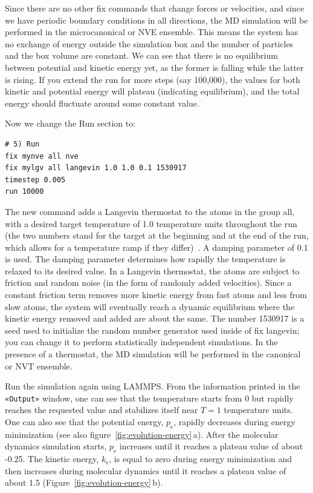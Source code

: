 \documentclass[9pt,tutorial]{livecoms}
\newcommand{\lmpcmd}[1]{\hspace{0pt}\colorbox{listing}{\textcolor{command}{\small{#1}}}\hspace{0pt}} %
\newcommand{\guicmd}[1]{\textcolor{command}{\texttt{«#1»}}} %
\begin{document}
Since there are no other fix commands that change forces or velocities,
and since we have periodic boundary conditions in all directions, the MD
simulation will be performed in the microcanonical or NVE ensemble.
This means the system has no exchange of energy outside the simulation
box and the number of particles and the box volume are constant.  We can
see that there is no equilibrium between potential and kinetic energy
yet, as the former is falling while the latter is rising.  If you extend
the run for more steps (say 100,000), the values for both kinetic and
potential energy will plateau (indicating equilibrium), and the total
energy should fluctuate around some constant value.

Now we change the \lmpcmd{Run} section to:
\begin{lstlisting}
# 5) Run
fix mynve all nve
fix mylgv all langevin 1.0 1.0 0.1 1530917
timestep 0.005
run 10000
\end{lstlisting}
The new command adds a Langevin thermostat to the atoms in the group
\lmpcmd{all}, with a desired target temperature of 1.0 temperature units
throughout the run (the two numbers stand for the target at the beginning
and at the end of the run, which allows for a temperature ramp if
they differ)~\cite{schneider1978molecular}.  A \lmpcmd{damping}
parameter of 0.1 is used.  The \lmpcmd{damping} parameter determines how
rapidly the temperature is relaxed to its desired value.  In a Langevin
thermostat, the atoms are subject to friction and random noise (in the form
of randomly added velocities).  Since a constant friction term removes
more kinetic energy from fast atoms and less from slow atoms, the system
will eventually reach a dynamic equilibrium where the kinetic energy
removed and added are about the same.  The number 1530917 is a
seed used to initialize the random number generator used inside of
\lmpcmd{fix langevin}; you can change it to perform statistically
independent simulations.  In the presence of a thermostat, the MD simulation
will be performed in the canonical or NVT ensemble.

Run the simulation again using LAMMPS. From the information
printed in the \guicmd{Output} window, one can see that the temperature
starts from 0 but rapidly reaches the requested value and
stabilizes itself near $T=1$ temperature units.  One can also see that
the potential energy, $p_\text{e}$, rapidly decreases during energy
minimization (see also figure~\ref{fig:evolution-energy}\,a).  After
the molecular dynamics simulation starts, $p_\text{e}$ increases until
it reaches a plateau value of about -0.25.  The kinetic energy,
$k_\text{e}$, is equal to zero during energy minimization and then
increases during molecular dynamics until it reaches a plateau value of
about 1.5 (Figure~\ref{fig:evolution-energy}\,b).
\end{document}
